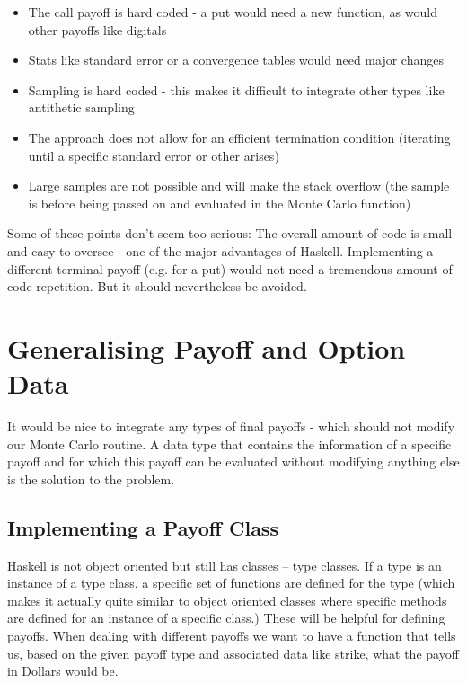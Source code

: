 \documentclass{scrartcl}
\begin{document}
\begin{itemize}
\item The call payoff is hard coded - a put would need a new function, as would other payoffs like digitals
\item Stats like standard error or a convergence tables would need major changes
\item Sampling is hard coded - this makes it difficult to integrate other types like antithetic sampling
\item The approach does not allow for an efficient termination condition (iterating until a specific standard error or other arises)
\item Large samples are not possible and will make the stack overflow (the sample is before being passed on and evaluated in the Monte Carlo function)
\end{itemize}

Some of these points don't seem too serious: The overall amount of code is small and easy to oversee - one of the major advantages of Haskell. Implementing a different terminal payoff (e.g. for a put) would not need a tremendous amount of code repetition. But it should nevertheless be avoided.

\section{Generalising Payoff and Option Data}

It would be nice to integrate any types of final payoffs - which should not modify our Monte Carlo routine. A data type that contains the information of a specific payoff and for which this payoff can be evaluated without modifying anything else is the solution to the problem.

\subsection{Implementing a Payoff Class}

Haskell is not object oriented but still has classes -- type classes. If a type is an instance of a type class, a specific set of functions are defined for the type (which makes it actually quite similar to object oriented classes where specific methods are defined for an instance of a specific class.) These will be helpful for defining payoffs. When dealing with different payoffs we want to have a function that tells us, based on the given payoff type and associated data like strike, what the payoff in Dollars would be.
\end{document}

